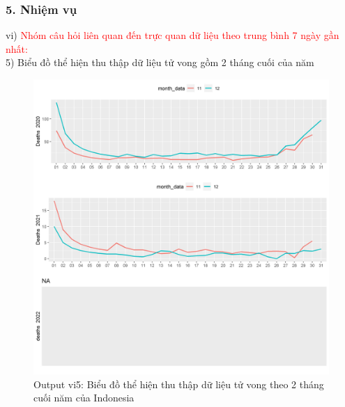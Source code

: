 \documentclass[english,10pt,table]{beamer}
\begin{document}
\begin{frame}[fragile]
\frametitle{5.  Nhiệm vụ}
vi) \textcolor{red}{Nhóm câu hỏi liên quan đến trực quan dữ liệu theo trung bình 7 ngày gần nhất:}\\
     5) Biểu đồ thể hiện thu thập dữ liệu tử vong gồm 2 tháng cuối của năm
	\begin{figure}[h!]
	\begin{center}
		    \includegraphics[scale = 0.26]{Images/VI/vi5 Indonesia .jpeg}
		     \caption{Output vi5: Biểu đồ thể hiện thu thập dữ liệu tử vong theo 2 tháng cuối năm của Indonesia}
		\end{center}
		\end{figure}
\end{frame}
\end{document}
